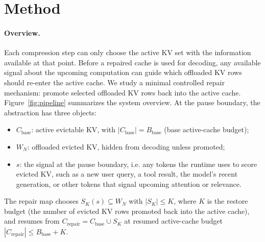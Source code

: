 \documentclass{article}
\newcommand{\bbase}{\ensuremath{B_{\mathrm{base}}}}
\begin{document}
\section{Method}
\label{sec:method}

\paragraph{Overview.}
Each compression step can only choose the active KV set
with the information available at that point.
Before a repaired cache is used for decoding, any available signal about the
upcoming computation can guide which offloaded KV rows should re-enter the
active cache.
We study a minimal controlled repair mechanism: promote selected offloaded
KV rows back into the active cache.
Figure~\ref{fig:pipeline} summarizes the system overview.
At the pause boundary, the abstraction has three objects:
\begin{itemize}[leftmargin=1.4em,noitemsep,topsep=2pt]
  \item $C_{\mathrm{base}}$: active evictable KV, with
  $|C_{\mathrm{base}}|=\bbase$ (base active-cache budget);
  \item $W_N$: offloaded evicted KV, hidden from decoding unless promoted; 
  \item $s$: the signal at the pause boundary, i.e. any
  tokens the runtime uses to score evicted KV, such as a new user
  query, a tool result, the model's recent generation, or other tokens
  that signal upcoming attention or relevance.
\end{itemize}
The repair map chooses $S_K(s)\subseteq W_N$ with
$|S_K|\le K$, where $K$ is the restore budget (the number of evicted KV
rows promoted back into the active cache), and resumes from
$C_{\mathrm{repair}}=C_{\mathrm{base}}\cup S_K$ at resumed
active-cache budget $|C_{\mathrm{repair}}|\le \bbase+K$. 
\end{document}
